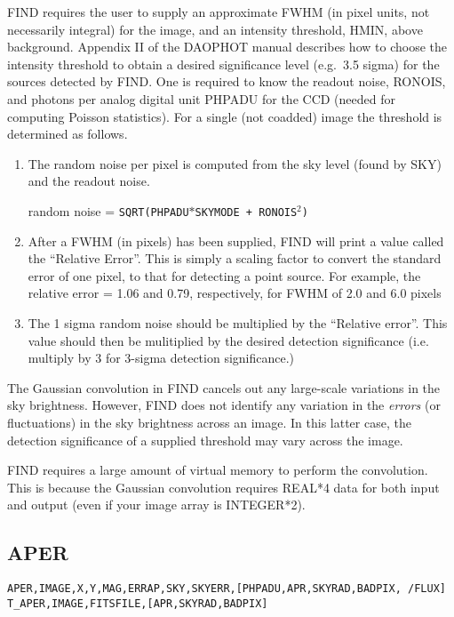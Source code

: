 FIND requires the user to supply an
approximate FWHM (in pixel units, not necessarily integral) for the image,
and an intensity threshold,
HMIN, above background.  Appendix II of the DAOPHOT manual describes
how to choose the intensity threshold to obtain a desired significance
level (e.g.\ 3.5 sigma) for the sources detected by FIND.
One is required to know the readout noise, RONOIS, and photons per
analog digital unit PHPADU for the CCD (needed for computing Poisson
statistics).  For a single (not coadded) image 
the threshold is determined as follows.
\begin{enumerate}
\item The random noise per pixel is computed from the sky level (found by
SKY) and the readout noise.
\begin{center}
random noise = {\tt SQRT(PHPADU$\ast$SKYMODE + RONOIS$^2$)}
\end{center}
\item After a FWHM (in pixels) 
has been supplied, FIND will print a value called the
``Relative Error''.  This is simply a scaling factor to convert the standard
error of one pixel, to that for detecting a point source.  For example,
the relative error = 1.06 and 0.79, respectively, for FWHM of 2.0 and 6.0
pixels
\item The 1 sigma random noise should be multiplied by the ``Relative error''.
This value should then be mulitiplied by the desired detection significance
(i.e. multiply by 3 for 3-sigma detection significance.)    
\end{enumerate}

The Gaussian convolution in FIND cancels out any large-scale variations
in the sky brightness.  However, FIND does not identify any variation 
in the {\em errors} (or fluctuations) in the sky brightness across an image.   
In this latter case, the detection significance of a supplied threshold 
may vary across the image.

FIND requires a large amount of virtual memory to perform the convolution.
This is because the Gaussian convolution requires REAL*4 data for both
input and output (even if your image array is INTEGER*2).  
\subsection{APER}
{\tt APER,IMAGE,X,Y,MAG,ERRAP,SKY,SKYERR,[PHPADU,APR,SKYRAD,BADPIX, /FLUX]} \\
{\tt T\_APER,IMAGE,FITSFILE,[APR,SKYRAD,BADPIX]} \\


